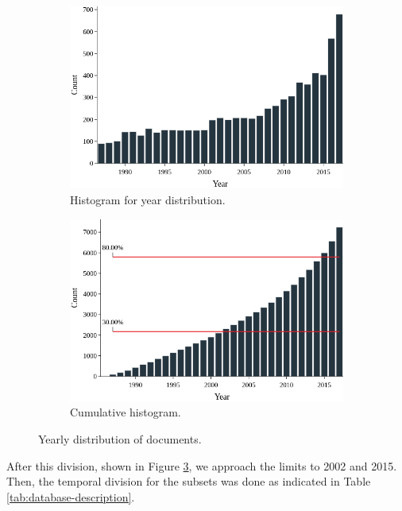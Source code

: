 \begin{figure}[h!]
	\begin{subfigure}{0.5\textwidth}
		\includegraphics[width=\linewidth]{01.Chapters/04.Materials/yearly-histogram}
		\caption{Histogram for year distribution.} \label{fig:yearly-histogram}
	\end{subfigure}%
	\hfill
	\begin{subfigure}{0.5\textwidth}
		\includegraphics[width=\linewidth]{01.Chapters/04.Materials/yearly-cumulative}
		\caption{Cumulative histogram.} \label{fig:yearly-cumulative}
	\end{subfigure}%
	\caption{Yearly distribution of documents.}
	\label{fig:yearly-distribution}
\end{figure}

After this division, shown in Figure \ref{fig:yearly-distribution}, we approach the limits to 2002 and 2015. Then, the temporal division for the subsets was done as indicated in Table \ref{tab:database-description}.

